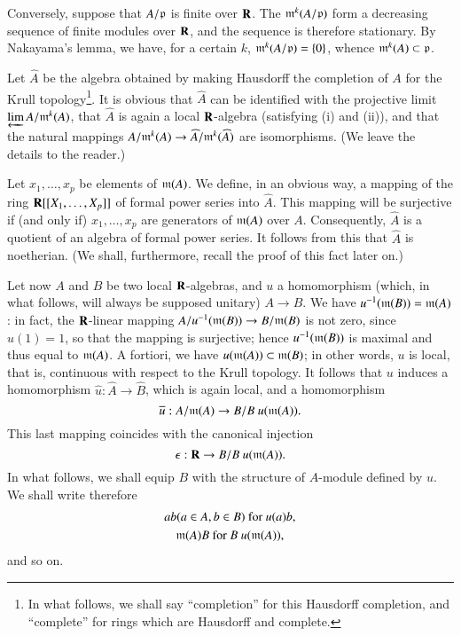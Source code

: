 Conversely, suppose that $A/\mathfrak{p}$ is finite over $\mathbf{R}$. The $\mathfrak{m}^{k}(A/\mathfrak{p})$ form a decreasing sequence of finite modules over $\mathbf{R}$, and the sequence is therefore stationary. By Nakayama's lemma, we have, for a certain $k$, $\mathfrak{m}^{k}(A/\mathfrak{p})=\{0\}$, whence $\mathfrak{m}^{k}(A)\subset\mathfrak{p}$.

Let $\widehat{A}$ be the algebra obtained by making Hausdorff the completion of $A$ for the Krull topology\footnote[1]{In what follows, we shall say ``completion'' for this Hausdorff completion, and ``complete'' for rings which are Hausdorff and complete.}. It is obvious that $\widehat{A}$ can be identified with the projective limit $\varprojlim A/\mathfrak{m}^{k}(A)$, that $\widehat{A}$ is again a local $\mathbf{R}$-algebra (satisfying (i) and (ii)), and that the natural mappings $A/\mathfrak{m}^{k}(A)\to \widehat{A}/\mathfrak{m}^{k}(\widehat{A})$ are isomorphisms. (We leave the details to the reader.)

Let $x_{1},\ldots,x_{p}$ be elements of $\mathfrak{m}(A)$. We define, in an obvious way, a mapping of the ring $\mathbf{R}[[X_{1},\ldots,X_{p}]]$ of formal power series into $\widehat{A}$. This mapping will be surjective if (and only if) $x_{1},\ldots,x_{p}$ are generators of $\mathfrak{m}(A)$ over $A$. Consequently, $\widehat{A}$ is a quotient of an algebra of formal power series. It follows from this that $\widehat{A}$ is noetherian. (We shall, furthermore, recall the proof of this fact later on.)

Let now $A$ and $B$ be two local $\mathbf{R}$-algebras, and $u$ a homomorphism (which, in what follows, will always be supposed unitary) $A\to B$. We have $u^{-1}(\mathfrak{m}(B))=\mathfrak{m}(A)$: in fact, the $\mathbf{R}$-linear mapping $A/u^{-1}(\mathfrak{m}(B))\to B/\mathfrak{m}(B)$ is not zero, since $u(1)=1$, so that the mapping is surjective; hence $u^{-1}(\mathfrak{m}(B))$ is maximal and thus equal to $\mathfrak{m}(A)$. A fortiori, we have $u(\mathfrak{m}(A))\subset \mathfrak{m}(B)$; in other words, $u$ is local, that is, continuous with respect to the Krull topology. It follows that $u$ induces a homomorphism $\widehat{u}:\widehat{A}\to \widehat{B}$, which is again local, and a homomorphism
$$
\overline{u}:A/\mathfrak{m}(A)\to B/B \ u (\mathfrak{m}(A)).
$$
This last mapping coincides with the canonical injection
$$
\epsilon:\bfR\to B/B \ u(\frakm(A)).
$$
In what follows, we shall equip $B$ with the structure of $A$-module defined by $u$. We shall write therefore
\begin{gather*}
ab(a\in A, b\in B)\text{ for } u(a)b,\\
\mathfrak{m}(A)B\text{ for } B \ u(\mathfrak{m}(A)),
\end{gather*}
and so on.

